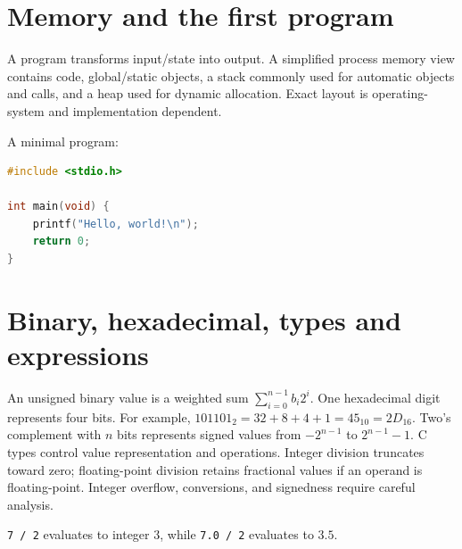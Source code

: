 \documentclass[11pt,a4paper]{article}
\begin{document}
\section{Memory and the first program}
A program transforms input/state into output. A simplified process memory view contains code, global/static objects, a stack commonly used for automatic objects and calls, and a heap used for dynamic allocation. Exact layout is operating-system and implementation dependent.
\begin{center}\end{center}
A minimal program:
\begin{lstlisting}[language=C]
#include <stdio.h>

int main(void) {
    printf("Hello, world!\n");
    return 0;
}
\end{lstlisting}
\section{Binary, hexadecimal, types and expressions}
An unsigned binary value is a weighted sum $\sum_{i=0}^{n-1}b_i2^i$. One hexadecimal digit represents four bits. For example, $101101_2=32+8+4+1=45_{10}=2D_{16}$. Two's complement with $n$ bits represents signed values from $-2^{n-1}$ to $2^{n-1}-1$.
C types control value representation and operations. Integer division truncates toward zero; floating-point division retains fractional values if an operand is floating-point. Integer overflow, conversions, and signedness require careful analysis.
\begin{exampleBox}\texttt{7 / 2} evaluates to integer $3$, while \texttt{7.0 / 2} evaluates to $3.5$.
\end{exampleBox}
\end{document}

